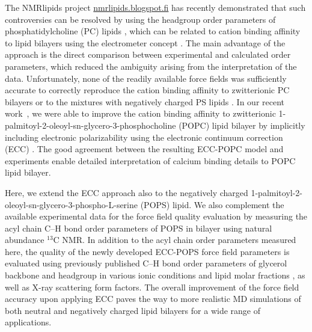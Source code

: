 \documentclass[journal=jpcbfk,manuscript=article]{achemso}
\begin{document}
The NMRlipids project \url{nmrlipids.blogspot.fi} has recently demonstrated
that such controversies can be resolved by using the headgroup order parameters
of phosphatidylcholine (PC) lipids \cite{catte16, NMRlipidsIV}, which can
be related to cation binding affinity to lipid bilayers using the electrometer
concept \cite{akutsu81,altenbach84,seelig87}. The main advantage of the approach
is the direct comparison between experimental and calculated order parameters,
which reduced the ambiguity arising from the interpretation of the data.
Unfortunately, none of the readily available force fields was sufficiently accurate to correctly reproduce the
cation binding affinity to zwitterionic PC bilayers \cite{catte16} or to the
mixtures with negatively charged PS lipids \cite{NMRlipidsIV}.
In our recent work~\cite{melcr18}, we were able to improve the cation binding affinity
to zwitterionic 1-palmitoyl-2-oleoyl-sn-glycero-3-phosphocholine (POPC) lipid bilayer
by implicitly including electronic polarizability using the electronic continuum
correction (ECC) \cite{leontyev09}. The good agreement between the resulting ECC-POPC
model and experiments enable detailed interpretation of calcium binding details to POPC lipid bilayer.


Here, we extend the ECC approach also to the negatively charged 1-palmitoyl-2-oleoyl-sn-glycero-3-phospho-L-serine (POPS) lipid.
We also complement the available experimental data for the force field quality
evaluation by measuring the acyl chain C--H bond order parameters of POPS in bilayer using natural abundance $^{13}$C NMR.
In addition to the acyl chain order parameters measured here, the quality of the newly developed ECC-POPS force field parameters is
evaluated using previously published C--H bond order parameters of glycerol backbone and headgroup in various ionic
conditions and lipid molar fractions \cite{roux90,NMRlipidsIV}, as well as X-ray scattering form factors\cite{kucerka14}.
The overall improvement of the force field accuracy upon applying ECC
paves the way to more realistic MD simulations 
of both neutral and negatively charged lipid bilayers 
for a wide range of applications.
\end{document}
